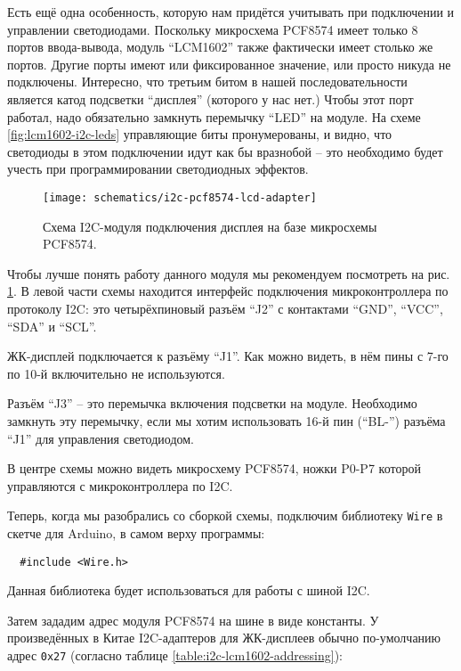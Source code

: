 \documentclass[../sparc.tex]{subfiles}
\begin{document}
Есть ещё одна особенность, которую нам придётся учитывать при подключении и
управлении светодиодами.  Поскольку микросхема PCF8574 имеет только 8 портов
ввода-вывода, модуль ``LCM1602'' также фактически имеет столько же портов.
Другие порты имеют или фиксированное значение, или просто никуда не подключены.
Интересно, что третьим битом в нашей последовательности является катод подсветки
``дисплея'' (которого у нас нет.)  Чтобы этот порт работал, надо обязательно
замкнуть перемычку ``LED'' на модуле.  На схеме \ref{fig:lcm1602-i2c-leds}
управляющие биты пронумерованы, и видно, что светодиоды в этом подключении идут
как бы вразнобой -- это необходимо будет учесть при программировании светодиодных
эффектов.

\begin{figure}[H]
  \centering
  \texttt{[image: schematics/i2c-pcf8574-lcd-adapter]}
  \caption{Схема I2C-модуля подключения дисплея на базе микросхемы PCF8574.}
  \label{fig:i2c-pcf8574-lcd-adapter-schematics}
\end{figure}

Чтобы лучше понять работу данного модуля мы рекомендуем посмотреть на рис.
\ref{fig:i2c-pcf8574-lcd-adapter-schematics}.  В левой части схемы находится
интерфейс подключения микроконтроллера по протоколу I2C: это четырёхпиновый
разъём ``J2'' с контактами ``GND'', ``VCC'', ``SDA'' и ``SCL''.

ЖК-дисплей подключается к разъёму ``J1''.  Как можно видеть, в нём пины с 7-го
по 10-й включительно не используются.

Разъём ``J3'' -- это перемычка включения подсветки на модуле.  Необходимо
замкнуть эту перемычку, если мы хотим использовать 16-й пин (``BL-'') разъёма
``J1'' для управления светодиодом.

В центре схемы можно видеть микросхему PCF8574, ножки P0-P7 которой управляются
с микроконтроллера по I2C.

Теперь, когда мы разобрались со сборкой схемы, подключим библиотеку
\texttt{Wire} в скетче для Arduino, в самом верху программы:

\begin{verbatim}
  #include <Wire.h>
\end{verbatim}

Данная библиотека будет использоваться для работы с шиной I2C.

Затем зададим адрес модуля PCF8574 на шине в виде константы.  У произведённых в
Китае I2C-адаптеров для ЖК-дисплеев обычно по-умолчанию адрес \texttt{0x27}
(согласно таблице \ref{table:i2c-lcm1602-addressing}):
\end{document}

